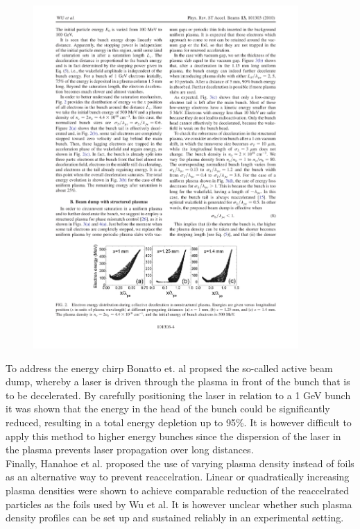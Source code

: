 \begin{figure}
\centering
\includegraphics[width=0.9\textwidth]{Wu_energy_uniform.pdf}
\caption{}
\label{Wu}
\end{figure}
To address the energy chirp Bonatto et. al \cite{Bonatto2015} propsed the so-called active beam dump, whereby a laser is driven through the plasma in front of the bunch that is to be decelerated. By carefully positioning the laser in relation to a 1 GeV bunch it was shown that the energy in the head of the bunch could be significantly reduced, resulting in a total energy depletion up to 95\%. It is however difficult to apply this method to higher energy bunches since the dispersion of the laser in the plasma prevents laser propagation over long distances. \\
Finally, Hanahoe et al. \cite{Hanahoe2017} proposed the use of varying plasma density instead of foils as an alternative way to prevent reaccelration. Linear or quadratically increasing plasma densities were shown to achieve comparable reduction of the reaccelrated particles as the foils used by Wu et al.  It is however unclear whether such plasma density profiles can be set up and sustained reliably in an experimental setting. \\
